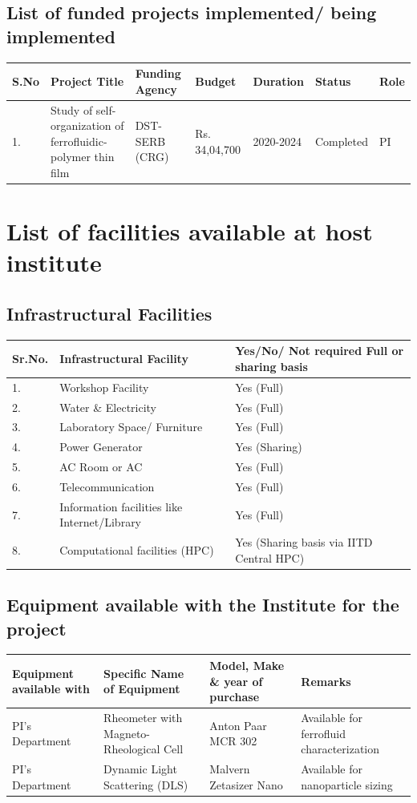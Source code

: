 \documentclass[11pt, a4paper]{article}
\begin{document}
\subsection{List of funded projects implemented/ being implemented}
\begin{tabular}{|p{0.5cm}|p{2cm}|p{2cm}|p{2cm}|p{2cm}|p{2cm}|p{2cm}|}
\hline
\textbf{S.No} & \textbf{Project Title} & \textbf{Funding Agency} & \textbf{Budget} & \textbf{Duration} & \textbf{Status} & \textbf{Role} \\
\hline
1. & Study of self-organization of ferrofluidic-polymer thin film & DST-SERB (CRG) & Rs. 34,04,700 & 2020-2024 & Completed & PI \\
\hline
\end{tabular}

\section{List of facilities available at host institute}

\subsection{Infrastructural Facilities}
\begin{tabular}{|p{1cm}|p{6cm}|p{6cm}|}
\hline
\textbf{Sr.No.} & \textbf{Infrastructural Facility} & \textbf{Yes/No/ Not required Full or sharing basis} \\
\hline
1. & Workshop Facility & Yes (Full) \\
2. & Water \& Electricity & Yes (Full) \\
3. & Laboratory Space/ Furniture & Yes (Full) \\
4. & Power Generator & Yes (Sharing) \\
5. & AC Room or AC & Yes (Full) \\
6. & Telecommunication & Yes (Full) \\
7. & Information facilities like Internet/Library & Yes (Full) \\
8. & Computational facilities (HPC) & Yes (Sharing basis via IITD Central HPC) \\
\hline
\end{tabular}

\subsection{Equipment available with the Institute for the project}
\begin{tabular}{|p{3cm}|p{4cm}|p{4cm}|p{3.5cm}|}
\hline
\textbf{Equipment available with} & \textbf{Specific Name of Equipment} & \textbf{Model, Make \& year of purchase} & \textbf{Remarks} \\
\hline
PI's Department & Rheometer with Magneto-Rheological Cell & Anton Paar MCR 302 & Available for ferrofluid characterization \\
PI's Department & Dynamic Light Scattering (DLS) & Malvern Zetasizer Nano & Available for nanoparticle sizing \\
\hline
\end{tabular}
\end{document}
